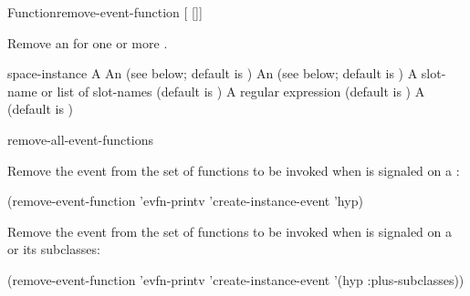 \documentclass[10pt,twoside,english,pdftex]{article}
\begin{document}

\begin{functiondoc}{Function}{remove-event-function}%
{ [ 
[]] \\
 }
%


\fnsyntax

\fnpurpose Remove an  for one or more .

\fnpackage {}

\fnmodule {}

\fnargs
\begin{args}{space-instance}
\arg[function] A 
 An  
(see below; default is )
 An 
(see below; default is )
 A slot-name or list of slot-names
(default is )
 A  regular expression
(default is \code{(*)})
\arg[permanent] A  (default is \nil)
\end{args}

\fndsyntax
\W\supp\tabletop
\eventclassspec
\subeventingspec
\syntaxsep
\unitclassinstancespec
\subclassingspec

\begin{alsos}{remove-all-event-functions}
\end{alsos}

\fnexamples
{}%
Remove the event   from the set of functions
to be invoked when  is signaled on a
 :
%
\W\supp
\begin{example}
  (remove-event-function 'evfn-printv 'create-instance-event 'hyp)
\end{example}
%
Remove the event   from the set of
functions to be invoked when  is signaled on a
  or its subclasses:
%
\W\supp\notpretop
\begin{example}
  (remove-event-function 'evfn-printv 'create-instance-event '(hyp :plus-subclasses))
\end{example}

\fnnote
\instanceevfnsnyi

\end{functiondoc}
\end{document}

